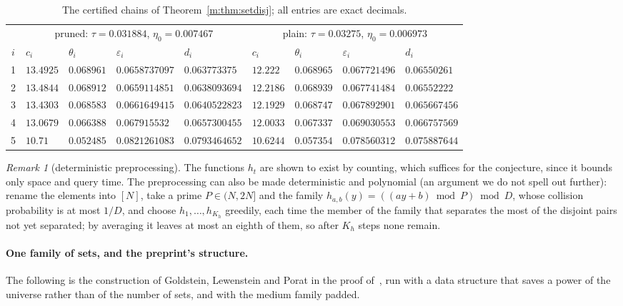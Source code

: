 \documentclass[11pt]{article}
\theoremstyle{definition}
\theoremstyle{remark}
\newtheorem{remark}[theorem]{Remark}
\begin{document}
\begin{table}[ht]
\centering\small
\setlength{\tabcolsep}{5pt}
\begin{tabular}{@{}c|llll|llll@{}}
 & \multicolumn{4}{c|}{pruned: $\tau=0.031884$, $\eta_0=0.007467$} & \multicolumn{4}{c}{plain: $\tau=0.03275$, $\eta_0=0.006973$}\\
$i$ & $c_i$ & $\theta_i$ & $\varepsilon_i$ & $d_i$ & $c_i$ & $\theta_i$ & $\varepsilon_i$ & $d_i$\\\hline
1 & $13.4925$ & $0.068961$ & $0.0658737097$ & $0.063773375$ & $12.222$ & $0.068965$ & $0.067721496$ & $0.06550261$\\
2 & $13.4844$ & $0.068912$ & $0.0659114851$ & $0.0638093694$ & $12.2186$ & $0.068939$ & $0.067741484$ & $0.06552222$\\
3 & $13.4303$ & $0.068583$ & $0.0661649415$ & $0.0640522823$ & $12.1929$ & $0.068747$ & $0.067892901$ & $0.065667456$\\
4 & $13.0679$ & $0.066388$ & $0.067915532$ & $0.0657300455$ & $12.0033$ & $0.067337$ & $0.069030553$ & $0.066757569$\\
5 & $10.71$ & $0.052485$ & $0.0821261083$ & $0.0793464652$ & $10.6244$ & $0.057354$ & $0.078560312$ & $0.075887644$
\end{tabular}
\caption{The certified chains of Theorem~\ref{m:thm:setdisj}; all entries are exact decimals.}
\label{m:tab:setdisj}
\end{table}

\begin{remark}[deterministic preprocessing]\label{m:rem:setdisjprep}
The functions $h_t$ are shown to exist by counting, which suffices for the conjecture, since it bounds only space and query time. The preprocessing can also be made deterministic and polynomial (an argument we do not spell out further): rename the elements into $[N]$, take a prime $P\in(N,2N]$ and the family $h_{a,b}(y)=((ay+b)\bmod P)\bmod D$, whose collision probability is at most $1/D$, and choose $h_1,\dots,h_{K_h}$ greedily, each time the member of the family that separates the most of the disjoint pairs not yet separated; by averaging it leaves at most an eighth of them, so after $K_h$ steps none remain.
\end{remark}

\paragraph{One family of sets, and the preprint's structure.} The following is the construction of Goldstein, Lewenstein and Porat in the proof of~\cite[Theorem~4]{GLP19}, run with a data structure that saves a power of the universe rather than of the number of sets, and with the medium family padded.
\end{document}
